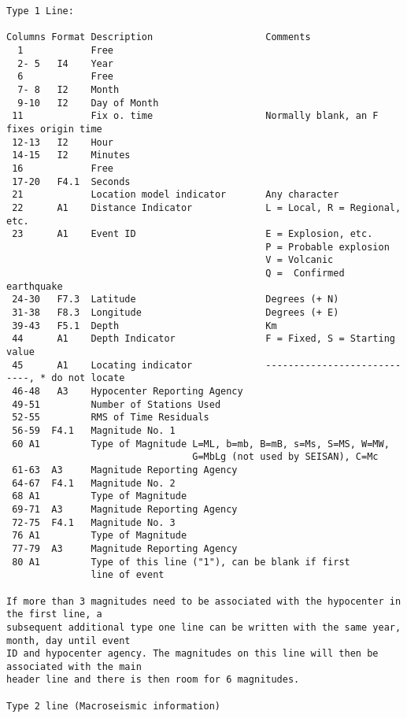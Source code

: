 \begin{verbatim}
Type 1 Line:

Columns Format Description                    Comments 
  1            Free 
  2- 5   I4    Year 
  6            Free 
  7- 8   I2    Month 
  9-10   I2    Day of Month
 11            Fix o. time                    Normally blank, an F fixes origin time 
 12-13   I2    Hour 
 14-15   I2    Minutes 
 16            Free 
 17-20   F4.1  Seconds 
 21            Location model indicator       Any character
 22      A1    Distance Indicator             L = Local, R = Regional, etc.
 23      A1    Event ID                       E = Explosion, etc.
                                              P = Probable explosion
                                              V = Volcanic 
                                              Q =  Confirmed earthquake
 24-30   F7.3  Latitude                       Degrees (+ N)
 31-38   F8.3  Longitude                      Degrees (+ E)
 39-43   F5.1  Depth                          Km 
 44      A1    Depth Indicator                F = Fixed, S = Starting value
 45      A1    Locating indicator             ----------------------------, * do not locate 
 46-48   A3    Hypocenter Reporting Agency
 49-51         Number of Stations Used 
 52-55         RMS of Time Residuals 
 56-59  F4.1   Magnitude No. 1
 60 A1         Type of Magnitude L=ML, b=mb, B=mB, s=Ms, S=MS, W=MW, 
                                 G=MbLg (not used by SEISAN), C=Mc
 61-63  A3     Magnitude Reporting Agency
 64-67  F4.1   Magnitude No. 2
 68 A1         Type of Magnitude
 69-71  A3     Magnitude Reporting Agency
 72-75  F4.1   Magnitude No. 3
 76 A1         Type of Magnitude
 77-79  A3     Magnitude Reporting Agency
 80 A1         Type of this line ("1"), can be blank if first
               line of event 

If more than 3 magnitudes need to be associated with the hypocenter in the first line, a
subsequent additional type one line can be written with the same year, month, day until event
ID and hypocenter agency. The magnitudes on this line will then be associated with the main
header line and there is then room for 6 magnitudes. 

Type 2 line (Macroseismic information) 


\end{verbatim}
